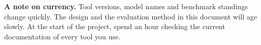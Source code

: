 \documentclass[11pt,a4paper]{article}
\begin{document}
\begin{plainbox}
\small\textbf{A note on currency.} Tool versions, model names and benchmark standings change quickly.
The design and the evaluation method in this document will age slowly. At the start of the
project, spend an hour checking the current documentation of every tool you use.
\end{plainbox}
\end{document}
